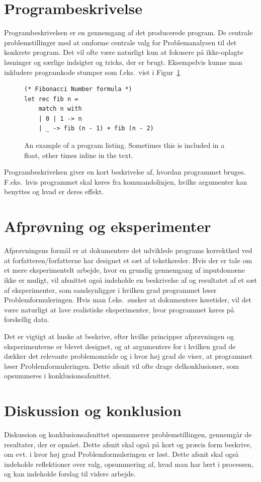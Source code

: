 \documentclass[a4paper]{article}
\begin{document}
\section{Programbeskrivelse}
Programbeskrivelsen er en gennemgang af det producerede program. De centrale problemstillinger med at omforme centrale valg for Problemanalysen til det konkrete program. Det vil ofte være naturligt kun at fokusere på ikke-oplagte løsninger og særlige indsigter og tricks, der er brugt. Eksempelvis kunne man inkludere programkode stumper som f.eks.\ vist i Figur~\ref{fig:fsharpCodeExample}
\begin{figure}
  \lstset{language=FSharp}
\begin{lstlisting}
(* Fibonacci Number formula *)
let rec fib n =
    match n with
    | 0 | 1 -> n
    | _ -> fib (n - 1) + fib (n - 2)
\end{lstlisting}
  \caption{An example of a program listing. Sometimes this is included in a float, other times inline in the text.}
  \label{fig:fsharpCodeExample}
\end{figure}


Programbeskrivelsen giver en kort beskrivelse af, hvordan programmet bruges. F.eks.\ hvis programmet skal køres fra kommandolinjen, hvilke argumenter kan benyttes og hvad er deres effekt. 


\section{Afprøvning og eksperimenter}
Afprøvningens formål er at dokumentere det udviklede programs korrekthed ved at forfatteren/forfatterne har designet et sæt af tekstkørsler. Hvis der er tale om et mere eksperimentelt arbejde, hvor en grundig gennemgang af inputdomæne ikke er muligt, vil afsnittet også indeholde en beskrivelse af og resultatet af et sæt af eksperimenter, som sandsynliggør i hvilken grad programmet løser Problemformuleringen. Hvis man f.eks.\ ønsker at dokumentere køretider, vil det være naturligt at lave realistiske eksperimenter, hvor programmet køres på forskellig data.

Det er vigtigt at huske at beskrive, efter hvilke principper afprøvningen og eksperimenterne er blevet designet, og at argumentere for i hvilken grad de dækker det relevante problemområde og i hvor høj grad de viser, at programmet løser Problemformuleringen. Dette afsnit vil ofte drage delkonklusioner, som opsummeres i konklusionsafsnittet.

\section{Diskussion og konklusion}
Diskussion og konklusionsafsnittet opsummerer problemstillingen, gennemgår de resultater, der er opnået. Dette afsnit skal også på kort og præcis form beskrive, om evt. i hvor høj grad Problemformuleringen er løst. Dette afsnit skal også indeholde reflektioner over valg, opsummering af, hvad man har lært i processen, og kan indeholde forslag til videre arbejde.
\end{document}
